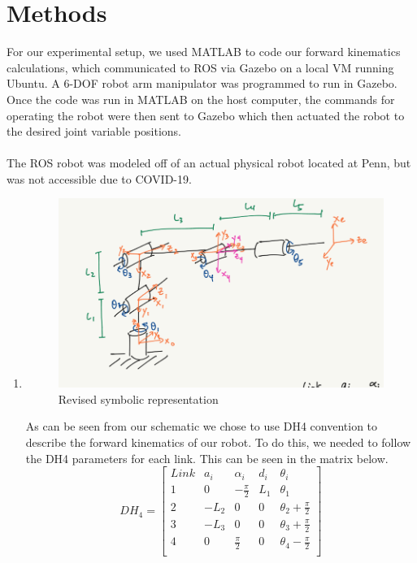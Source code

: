 \documentclass[12pt]{article}
\begin{document}
\section{Methods}
For our experimental setup, we used MATLAB to code our forward kinematics calculations, which communicated to ROS via Gazebo on a local VM running Ubuntu. A 6-DOF robot arm manipulator was programmed to run in Gazebo. Once the code was run in MATLAB on the host computer, the commands for operating the robot were then sent to Gazebo which then actuated the robot to the desired joint variable positions. \\ \\
The ROS robot was modeled off of an actual physical robot located at Penn, but was not accessible due to COVID-19.
\begin{enumerate}
\item \begin{figure} [h]
	\centering 
	\includegraphics[scale=1]{Q1.png}
	\caption{Revised symbolic representation}
	\end{figure}
\par{ As can be seen from our schematic we chose to use DH4 convention to describe the forward kinematics of our robot.
To do this, we needed to follow the DH4 parameters for each link. This can be seen in the matrix below.}
\begin{equation}
	DH_{4} = \begin{bmatrix}
	Link & a_{i} & \alpha_{i} &d_{i} &\theta_{i}\\
	1&0 & -\frac{\pi}{2} & L_{1}&  \theta_{1}\\
	2&-L_{2}  & 0 & 0 &  \theta_{2}+\frac{\pi}{2}\\
	3&-L_{3} & 0 & 0 & \theta_{3}+\frac{\pi}{2}\\
	4&0 & \frac{\pi}{2} & 0 & \theta_{4}-\frac{\pi}{2}\\

\end{bmatrix}
\end{equation}
\end{enumerate}
\end{document}
